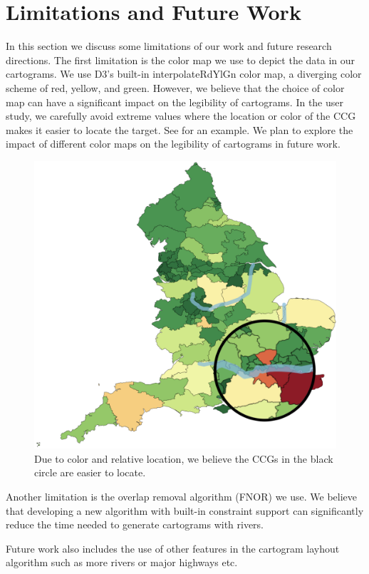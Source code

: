 \section{Limitations and Future Work}

In this section we discuss some limitations of our work and future research directions. The first limitation is the color map we use to depict the data in our cartograms. We use D3's built-in interpolateRdYlGn color map, a diverging color scheme of red, yellow, and green. However, we believe that the choice of color map can have a significant impact on the legibility of cartograms. In the user study, we carefully avoid extreme values where the location or color of the CCG makes it easier to locate the target. See  for an example. We plan to explore the impact of different color maps on the legibility of cartograms in future work.

{
    \begin{figure}[tb!]
        \centering
        \includegraphics[width=\columnwidth,keepaspectratio]{figure/limitations/extreme.png}
        \caption{Due to color and relative location, we believe the CCGs in the black circle are easier to locate.}
        \label{fig:extreme}
    \end{figure}
}

Another limitation is the overlap removal algorithm (FNOR) we use. We believe that developing a new algorithm with built-in constraint support can significantly reduce the time needed to generate cartograms with rivers.

Future work also includes the use of other features in the cartogram layhout algorithm such as more rivers or major highways etc.
